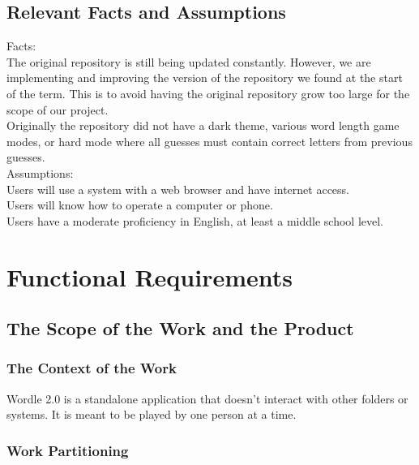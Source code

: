 \documentclass[12pt, titlepage]{article}
\begin{document}
	\subsection{Relevant Facts and Assumptions}
	
	Facts:\\ The original repository is still being updated constantly. 
	However, 
	we
	are implementing and improving the version of the repository we found at the
	start of the term. This is to avoid having the original repository grow too
	large for the scope of our project. \\ Originally the repository did not 
	have
	a dark theme, various word length game modes, or hard mode where all guesses
	must contain correct letters from previous guesses. \\ Assumptions: \\ 
	Users will use a system with a web
	browser and have internet access. \\ Users will know how to operate a
	computer or phone.\\ Users have a moderate proficiency in English, at least 
	a
	middle school level.
	
	\section{Functional Requirements}
	
	\subsection{The Scope of the Work and the Product}
	
	\subsubsection{The Context of the Work}
	Wordle 2.0 is a standalone application that doesn't interact with other 
	folders or systems. It is meant to be played by one person at a time.
	\newpage
	\subsubsection{Work Partitioning}
	
\end{document}
